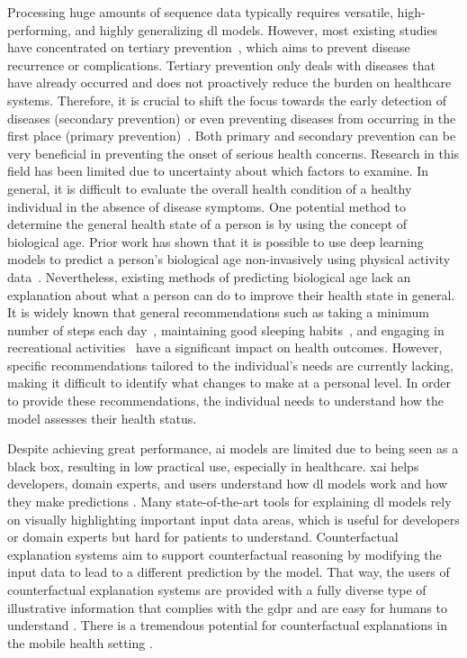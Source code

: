 Processing huge amounts of sequence data typically requires versatile, high-performing, and highly generalizing \gls{dl} models.
 However, most existing studies have concentrated on tertiary prevention~\cite{barata_bitemporal_2024}, which aims to prevent disease recurrence or complications. Tertiary prevention only deals with diseases that have already occurred and does not proactively reduce the burden on healthcare systems. Therefore, it is crucial to shift the focus towards the early detection of diseases (secondary prevention) or even preventing diseases from occurring in the first place (primary prevention)~\cite{vlachopoulos_role_2015}.
Both primary and secondary prevention can be very beneficial in preventing the onset of serious health concerns. Research in this field has been limited due to uncertainty about which factors to examine. In general, it is difficult to evaluate the overall health condition of a healthy individual in the absence of disease symptoms.
One potential method to determine the general health state of a person is by using the concept of biological age. Prior work has shown that it is possible to use deep learning models to predict a person's biological age non-invasively using physical activity data~\cite{pyrkov_extracting_2018, rahman_deep_2019}.
Nevertheless, existing methods of predicting biological age lack an explanation about what a person can do to improve their health state in general. It is widely known that general recommendations such as taking a minimum number of steps each day~\cite{tudor-locke_how_2011}, maintaining good sleeping habits~\cite{shim_wearable-based_2023}, and engaging in recreational activities~\cite{saxena_mental_2005} have a significant impact on health outcomes. However, specific recommendations tailored to the individual's needs are currently lacking, making it difficult to identify what changes to make at a personal level. In order to provide these recommendations, the individual needs to understand how the model assesses their health status.

Despite achieving great performance, \gls{ai} models are limited due to being seen as a black box, resulting in low practical use, especially in healthcare. \gls{xai} helps developers, domain experts, and users understand how \gls{dl} models work and how they make predictions \cite{loh_application_2022}. Many state-of-the-art tools for explaining \gls{dl} models rely on visually highlighting important input data areas, which is useful for developers or domain experts but hard for patients to understand. Counterfactual explanation systems \cite{byrne_counterfactuals_2019} aim to support counterfactual reasoning by modifying the input data to lead to a different prediction by the model. That way, the users of counterfactual explanation systems are provided with a fully diverse type of illustrative information that complies with the \gls{gdpr}\cite{wachter_counterfactual_2018} and are easy for humans to understand \cite{miller_explanation_2019}. There is a tremendous potential for counterfactual explanations in the mobile health setting \cite{lee_clinical_2024}. 

